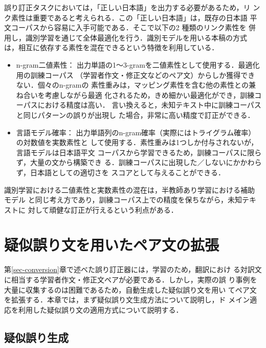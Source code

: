 \documentclass[japanese]{jnlp_1.4}
\begin{document}
誤り訂正タスクにおいては，「正しい日本語」を出力する必要があるため，リ
ンク素性は重要であると考えられる．この「正しい日本語」は，既存の日本語
平文コーパスから容易に入手可能である．そこで以下の2 種類のリンク素性を
併用し，識別学習を通じて全体最適化を行う．識別モデルを用いる本稿の方式
は，相互に依存する素性を混在できるという特徴を利用している．

\begin{itemize}
\item n-gram二値素性：
出力単語の1〜3-gramを二値素性として使用する．最適化用の訓練コーパス
（学習者作文・修正文などのペア文）からしか獲得できない．個々のn-gramの
素性重みは，マッピング素性を含む他の素性との兼ね合いを考慮しながら最適
化されるため，きめ細かい最適化ができ，訓練コーパスにおける精度は高い．
言い換えると，未知テキスト中に訓練コーパスと同じパターンの誤りが出現し
た場合，非常に高い精度で訂正ができる．

\item 言語モデル確率：
出力単語列のn-gram確率（実際にはトライグラム確率）の対数値を実数素性と
して使用する．素性重みは1つしか付与されないが，言語モデルは日本語平文
コーパスから学習できるため，訓練コーパスに限らず，大量の文から構築でき
る．訓練コーパスに出現した／しないにかかわらず，日本語としての適切さを
スコアとして与えることができる．
\end{itemize}

識別学習における二値素性と実数素性の混在は，半教師あり学習における補助
モデル
と同じ考え方であり，訓練コーパス上での精度を保ちながら，未知テキストに
対して頑健な訂正が行えるという利点がある．



\section{疑似誤り文を用いたペア文の拡張}
\label{sec-pseudo-sentences}

第\ref{sec-conversion}章で述べた誤り訂正器には，学習のため，翻訳におけ
る対訳文に相当する学習者作文・修正文ペアが必要である．しかし，実際の誤
り事例を大量に収集するのは困難であるため，自動生成した疑似誤り文を用い
てペア文を拡張する．本章では，まず疑似誤り文生成方法について説明し，ド
メイン適応を利用した疑似誤り文の適用方式について説明する．


\subsection{疑似誤り生成}
\end{document}
